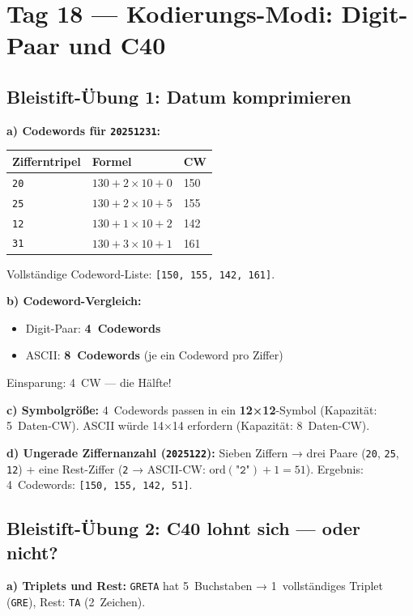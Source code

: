 \section*{Tag 18 — Kodierungs-Modi: Digit-Paar und C40}

\subsection*{Bleistift-Übung 1: Datum komprimieren}

\textbf{a) Codewords für \texttt{20251231}:}

\begin{center}
\begin{tabular}{lll}
\hline
\textbf{Zifferntripel} & \textbf{Formel} & \textbf{CW} \\
\hline
\texttt{20} & $130 + 2 \times 10 + 0$ & 150 \\
\texttt{25} & $130 + 2 \times 10 + 5$ & 155 \\
\texttt{12} & $130 + 1 \times 10 + 2$ & 142 \\
\texttt{31} & $130 + 3 \times 10 + 1$ & 161 \\
\hline
\end{tabular}
\end{center}

Vollständige Codeword-Liste: \texttt{[150, 155, 142, 161]}.

\textbf{b) Codeword-Vergleich:}
\begin{itemize}
\item Digit-Paar: \textbf{4~Codewords}
\item ASCII: \textbf{8~Codewords} (je ein Codeword pro Ziffer)
\end{itemize}
Einsparung: 4~CW — die Hälfte!

\textbf{c) Symbolgröße:}
4~Codewords passen in ein \textbf{12×12}-Symbol (Kapazität: 5~Daten-CW).
ASCII würde 14×14 erfordern (Kapazität: 8~Daten-CW).

\textbf{d) Ungerade Ziffernanzahl (\texttt{2025122}):}
Sieben Ziffern → drei Paare (\texttt{20}, \texttt{25}, \texttt{12})
+ eine Rest-Ziffer (\texttt{2} → ASCII-CW: $\text{ord}(\texttt{"2"})+1 = 51$).
Ergebnis: 4~Codewords: \texttt{[150, 155, 142, 51]}.

\subsection*{Bleistift-Übung 2: C40 lohnt sich — oder nicht?}

\textbf{a) Triplets und Rest:}
\texttt{GRETA} hat 5~Buchstaben → 1~vollständiges Triplet (\texttt{GRE}),
Rest: \texttt{TA} (2~Zeichen).

